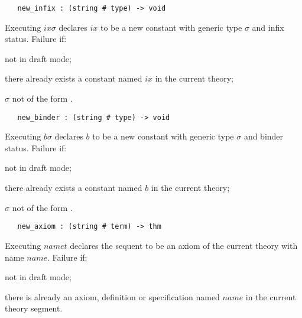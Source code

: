 {\begin{boxed}
\begin{verbatim}
   new_infix : (string # type) -> void
\end{verbatim}\end{boxed}


\noindent Executing $ix$$\sigma$\ml{)}
declares $ix$ to be a new constant with generic type $\sigma$ and
infix status.
Failure if:
\begin{myenumerate}
\item not in draft mode;
\item there already exists a constant named $ix$ in the current theory;
\item $\sigma$ not of the form .
\end{myenumerate}


\begin{boxed}
\begin{verbatim}
   new_binder : (string # type) -> void
\end{verbatim}\end{boxed}


\noindent Executing $b$$\sigma$\ml{)}
declares $b$ to be a new constant with generic type $\sigma$ and 
binder status.
Failure if:
\begin{myenumerate}
\item not in draft mode;
\item there already exists a constant named $b$ in the current theory;
\item $\sigma$ not of the form .
\end{myenumerate}

\begin{boxed}
\begin{verbatim}
   new_axiom : (string # term) -> thm
\end{verbatim}\end{boxed}


\noindent Executing $name$$t$\ml{)} declares the 
sequent
 to be an axiom of the current theory with name $name$. 
Failure if:
\begin{myenumerate}
\item not in draft mode;
\item there is already an axiom, definition or specification 
named $name$ in the current theory segment.
\end{myenumerate}


}
